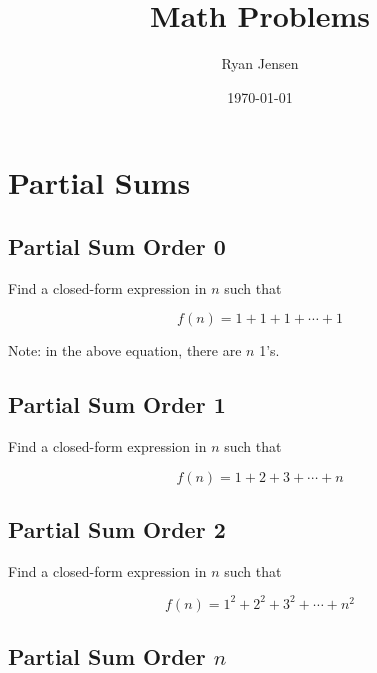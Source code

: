 \documentclass[letterpaper, 11pt]{report}
\numberwithin{equation}{section}
\begin{document}
	
	
	\author{Ryan Jensen}
	\title{Math Problems}
	\date{\today}
	\maketitle
	
	
	
	\tableofcontents
	
	
	
	
	
	
	\chapter{Partial Sums}
		
		
		
		\section{Partial Sum Order 0}
			
			Find a closed-form expression in $ n $ such that
			
			\begin{equation}
				f(n) = 1 + 1 + 1 + \cdots + 1
			\end{equation}
			
			Note: in the above equation, there are $n$ 1's.
			
		\section{Partial Sum Order 1}
				
			Find a closed-form expression in $ n $ such that
			
			\begin{equation}
				f(n) = 1 + 2 + 3 + \cdots + n
			\end{equation}
			
			
		\section{Partial Sum Order 2}
			
			Find a closed-form expression in $ n $ such that
			
			\begin{equation}
				f(n) = 1^2 + 2^2 + 3^2 + \cdots + n^2
			\end{equation}
			
			
		\section{Partial Sum Order $n$}
			
\end{document}

